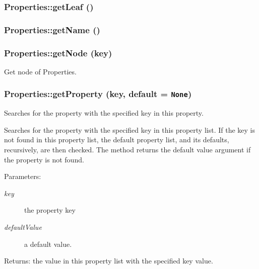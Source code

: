 \subsubsection{\setlength{\rightskip}{0pt plus 5cm}Properties::get\-Leaf ()}\label{classProperties_Propertiesa6}


\subsubsection{\setlength{\rightskip}{0pt plus 5cm}Properties::get\-Name ()}\label{classProperties_Propertiesa3}


\subsubsection{\setlength{\rightskip}{0pt plus 5cm}Properties::get\-Node (key)}\label{classProperties_Propertiesa19}


Get node of Properties. 

\subsubsection{\setlength{\rightskip}{0pt plus 5cm}Properties::get\-Property (key, default = {\tt None})}\label{classProperties_Propertiesa8}


Searches for the property with the specified key in this property. 

Searches for the property with the specified key in this property list. If the key is not found in this property list, the default property list, and its defaults, recursively, are then checked. The method returns the default value argument if the property is not found.

\begin{Desc}
\item[Parameters:]
\begin{description}
\item[{\em key}]the property key \item[{\em default\-Value}]a default value. \end{description}
\end{Desc}
\begin{Desc}
\item[Returns:]the value in this property list with the specified key value.\end{Desc}
